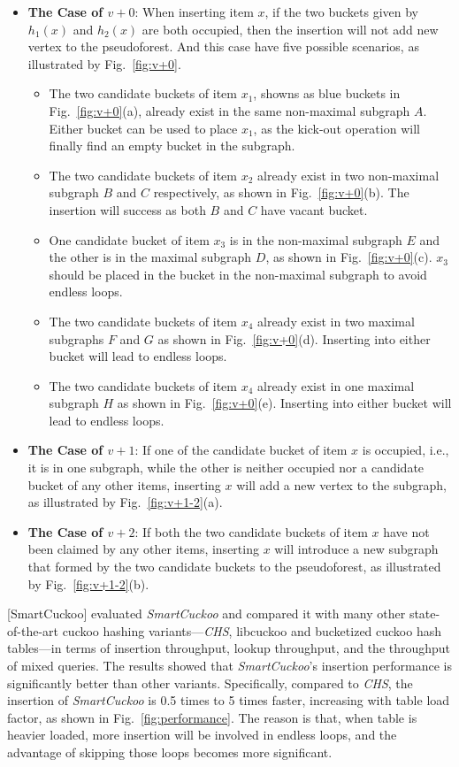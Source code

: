 \documentclass[runningheads]{llncs}
\begin{document}
\begin{itemize}
    \item \textbf{The Case of $v+0$}: When inserting item $x$, if the two buckets given by $h_1(x)$ and $h_2(x)$ are both occupied, then the insertion will not add new vertex to the pseudoforest. And this case have five possible scenarios, as illustrated by Fig.~\ref{fig:v+0}.
    \begin{itemize}
        \item The two candidate buckets of item $x_1$, showns as blue buckets in Fig.~\ref{fig:v+0}(a), already exist in the same non-maximal subgraph $A$. Either bucket can be used to place $x_1$, as the kick-out operation will finally find an empty bucket in the subgraph.
        \item The two candidate buckets of item $x_2$ already exist in two non-maximal subgraph $B$ and $C$ respectively, as shown in Fig.~\ref{fig:v+0}(b). The insertion will success as both $B$ and $C$ have vacant bucket.
        \item One candidate bucket of item $x_3$ is in the non-maximal subgraph $E$ and the other is in the maximal subgraph $D$, as shown in Fig.~\ref{fig:v+0}(c). $x_3$ should be placed in the bucket in the non-maximal subgraph to avoid endless loops.
        \item The two candidate buckets of item $x_4$ already exist in two maximal subgraphs $F$ and $G$ as shown in Fig.~\ref{fig:v+0}(d). Inserting into either bucket will lead to endless loops.
        \item The two candidate buckets of item $x_4$ already exist in one maximal subgraph $H$ as shown in Fig.~\ref{fig:v+0}(e). Inserting into either bucket will lead to endless loops.
    \end{itemize}
    \item \textbf{The Case of $v+1$}: If one of the candidate bucket of item $x$ is occupied, i.e., it is in one subgraph, while the other is neither occupied nor a candidate bucket of any other items, inserting $x$ will add a new vertex to the subgraph, as illustrated by Fig.~\ref{fig:v+1-2}(a).
    \item \textbf{The Case of $v+2$}: If both the two candidate buckets of item $x$ have not been claimed by any other items, inserting $x$ will introduce a new subgraph that formed by the two candidate buckets to the pseudoforest, as illustrated by Fig.~\ref{fig:v+1-2}(b).
\end{itemize}

[SmartCuckoo] evaluated \textit{SmartCuckoo} and compared it with many other state-of-the-art cuckoo hashing variants---\textit{CHS}, libcuckoo and bucketized cuckoo hash tables---in terms of insertion throughput, lookup throughput, and the throughput of mixed queries. The results showed that \textit{SmartCuckoo}'s insertion performance is significantly better than other variants. Specifically, compared to \textit{CHS}, the insertion of \textit{SmartCuckoo} is 0.5 times to 5 times faster, increasing with table load factor, as shown in Fig.~\ref{fig:performance}. The reason is that, when table is heavier loaded, more insertion will be involved in endless loops, and the advantage of skipping those loops becomes more significant.
\end{document}
